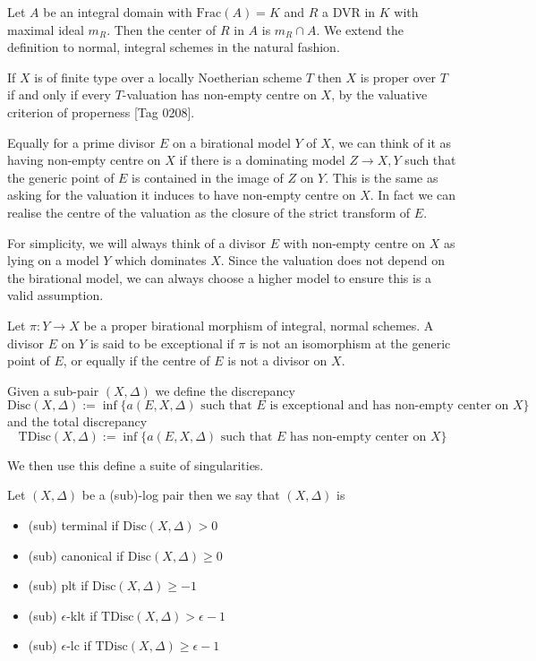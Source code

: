 \begin{definition}
	Let $A$ be an integral domain with $\text{Frac}(A)=K$ and $R$ a DVR in $K$ with maximal ideal $m_{R}$. Then the center of $R$ in $A$ is $m_{R}\cap A$. We extend the definition to normal, integral schemes in the natural fashion.
\end{definition}

If $X$ is of finite type over a locally Noetherian scheme $T$ then $X$ is proper over $T$ if and only if every $T$-valuation has non-empty centre on $X$, by the valuative criterion of properness \cite{stacks-project}[Tag 0208]. 

Equally for a prime divisor $E$ on a birational model $Y$ of $X$, we can think of it as having non-empty centre on $X$ if there is a dominating model $Z \to X,Y$ such that the generic point of $E$ is contained in the image of $Z$ on $Y$. This is the same as asking for the valuation it induces to have non-empty centre on $X$. In fact we can realise the centre of the valuation as the closure of the strict transform of $E$.

For simplicity, we will always think of a divisor $E$ with non-empty centre on $X$ as lying on a model $Y$ which dominates $X$. Since the valuation does not depend on the birational model, we can always choose a higher model to ensure this is a valid assumption. 

\begin{definition}
	
	Let $\pi:Y \to X$ be a proper birational morphism of integral, normal schemes. A divisor $E$ on $Y$ is said to be exceptional if $\pi$ is not an isomorphism at the generic point of $E$, or equally if the centre of $E$ is not a divisor on $X$.
	
	Given a sub-pair $(X,\Delta)$ we define the discrepancy $$\text{Disc}(X,\Delta):=\inf \{a(E,X,\Delta) \text{ such that } E \text{ is exceptional and has non-empty center on } X\}$$
	and the total discrepancy 
	$$\text{TDisc}(X,\Delta):=\inf \{a(E,X,\Delta) \text { such that } E \text{ has non-empty center on } X\}$$
\end{definition}

We then use this define a suite of singularities.

\begin{definition}
	Let $(X,\Delta)$ be a (sub)-log pair then we say that $(X,\Delta)$ is
	\begin{itemize}
	\item 	(sub) terminal if $\text{Disc}(X,\Delta) > 0$
	\item	(sub) canonical if $\text{Disc}(X,\Delta)\geq 0$
	\item 	(sub) plt if $\text{Disc}(X,\Delta)\geq -1$
	\item	(sub) $\epsilon$-klt if $\text{TDisc}(X,\Delta) > \epsilon-1$
	\item	(sub) $\epsilon$-lc if $\text{TDisc}(X,\Delta) \geq \epsilon -1$
	\end{itemize}
\end{definition}

